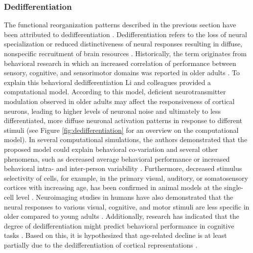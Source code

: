 \subsubsection{Dedifferentiation}
\label{theory:aging:dedif}
The functional reorganization patterns described in the previous section have been attributed to dedifferentiation \cite{Grady2012}. Dedifferentiation refers to the loss of neural specialization or reduced distinctiveness of neural responses resulting in diffuse, nonspecific recruitment of brain resources \cite{Koen2019}. Historically, the term originates from behavioral research in which an increased correlation of performance between sensory, cognitive, and sensorimotor domains was reported in older adults \cite{Baltes1997,Li2002}. To explain this behavioral dedifferentiation Li and colleagues \cite{Li2001, Li2002} provided a computational model. According to this model, deficient neurotransmitter modulation observed in older adults may affect the responsiveness of cortical neurons, leading to higher levels of neuronal noise and ultimately to less differentiated, more diffuse neuronal activation patterns in response to different stimuli \cite{Li2001,Li2002} (see Figure \autoref{fig:dedifferentiation} for an overview on the computational model). In several computational simulations, the authors demonstrated that the proposed model could explain behavioral co-variation and several other phenomena, such as decreased average behavioral performance or increased behavioral intra- and inter-person variability \cite{Li2000,Li2002}. Furthermore, decreased stimulus selectivity of cells, for example, in the primary visual, auditory, or somatosensory cortices with increasing age, has been confirmed in animal models at the single-cell level \cite{Koen2019, Schmolesky2000, Costa2016, Spengler1995}. Neuroimaging studies in humans have also demonstrated that the neural responses to various visual, cognitive, and motor stimuli are less specific in older compared to young adults \cite{Tucker2019, Koen2019,Carb2011}. Additionally, research has indicated that the degree of dedifferentiation might predict behavioral performance in cognitive tasks \cite{Koen2019}. Based on this, it is hypothesized that age-related decline is at least partially due to the dedifferentiation of cortical representations \cite{Koen2019}.

